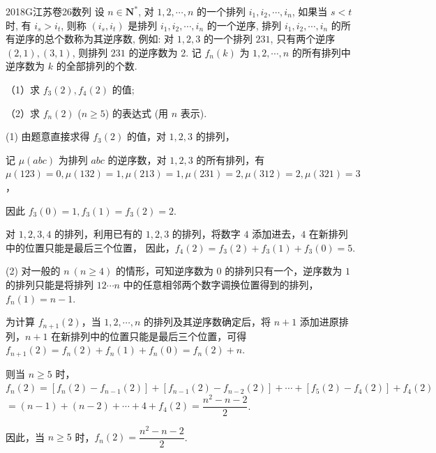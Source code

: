 
\begin{problem}{2018}{G}{江苏卷}{26}{数列}
设 $n \in \mathbf{N}^*$, 对 $1, 2, \cdots, n$ 的一个排列 $i_1, i_2, \cdots, i_n$, 如果当 $s<t$ 时, 有 $i_s > i_t$, 则称 $(i_s, i_t)$ 是排列 $i_1, i_2, \cdots, i_n$ 的一个逆序, 排列 $i_1, i_2, \cdots, i_n$ 的所有逆序的总个数称为其逆序数, 例如: 对 $1, 2, 3$ 的一个排列 $231$, 只有两个逆序 $(2, 1), (3, 1)$, 则排列 $231$ 的逆序数为 2. 记 $f_n(k)$ 为 $1, 2, \cdots, n$ 的所有排列中逆序数为 $k$ 的全部排列的个数.

（1）求 $f_3(2), f_4(2)$ 的值;

（2）求 $f_n(2)$ ($n \ge 5$) 的表达式 (用 $n$ 表示).
\end{problem}

\begin{solutions}
(1) 由题意直接求得 $f_3(2)$ 的值，对 $1, 2, 3$ 的排列，

记 $\mu(abc)$ 为排列 $abc$ 的逆序数，对 $1, 2, 3$ 的所有排列，有
$\mu(123)=0, \mu(132)=1, \mu(213)=1, \mu(231)=2, \mu(312)=2, \mu(321)=3$，

因此 $f_3(0)=1, f_3(1)=f_3(2)=2$.

对 $1, 2, 3, 4$ 的排列，利用已有的 $1, 2, 3$ 的排列，将数字 $4$ 添加进去，$4$ 在新排列中的位置只能是最后三个位置，
因此，$f_4(2)=f_3(2)+f_3(1)+f_3(0)=5$.

(2) 对一般的 $n\ (n \ge 4)$ 的情形，可知逆序数为 $0$ 的排列只有一个，逆序数为 $1$ 的排列只能是将排列 $12\cdots n$ 中的任意相邻两个数字调换位置得到的排列，$f_n(1)=n-1$.

为计算 $f_{n+1}(2)$，当 $1, 2, \cdots, n$ 的排列及其逆序数确定后，将 $n+1$ 添加进原排列，$n+1$ 在新排列中的位置只能是最后三个位置，可得 $f_{n+1}(2)=f_n(2)+f_n(1)+f_n(0)=f_n(2)+n$.

则当 $n \ge 5$ 时，$f_n(2)=[f_n(2)-f_{n-1}(2)]+[f_{n-1}(2)-f_{n-2}(2)]+\cdots+[f_5(2)-f_4(2)]+f_4(2)$
$=(n-1)+(n-2)+\cdots+4+f_4(2)=\dfrac{n^2-n-2}{2}$.

因此，当 $n \ge 5$ 时，$f_n(2)=\dfrac{n^2-n-2}{2}$.
\end{solutions}
